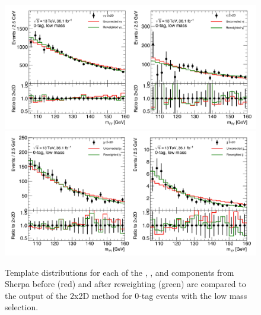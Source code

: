\begin{figure}[!htb]
  \centering
  \includegraphics[width=\textwidth]{chapters/chapter5_yybb/images/2x2d/low_mass_1_clean.pdf}\\
  \includegraphics[width=\textwidth]{chapters/chapter5_yybb/images/2x2d/low_mass_2_clean.pdf}
  \caption[Template distributions for each of the \yy, \yj, \jy and \jj components before and after reweighting compared to the output of the 2x2D method for 0-tag events with the low mass selection]{Template distributions for each of the \yy, \yj, \jy and \jj components from Sherpa before (red) and after reweighting (green) are compared to the output of the 2x2D method for 0-tag events with the low mass selection.
    \label{fig:2x2D_templates_lowMass}}
\end{figure}

